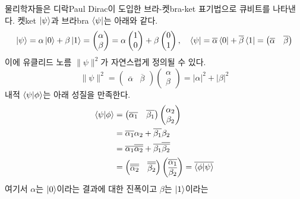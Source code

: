 \documentclass[a4paper,chapter,atbegshi]{oblivoir}
\begin{document}
물리학자들은 디락{\tiny Paul Dirac}이 도입한 브라-켓{\tiny bra-ket} 표기법으로
큐비트를 나타낸다. 켓{\tiny ket} $\ket{\psi}$과 브라{\tiny bra} $\bra{\psi}$는
아래와 같다.
 \[
   \ket{\psi} = \alpha\ket0+\beta\ket1 = \begin{pmatrix}\alpha\\\beta\end{pmatrix}
  =\alpha\begin{pmatrix}1\\0\end{pmatrix}+\beta\begin{pmatrix}0\\1\end{pmatrix},
  \quad
  \bra{\psi} = \overline{\alpha}\bra0 +\overline{\beta}\bra1=
   \begin{pmatrix}\overline{\alpha}&\overline{\beta}\end{pmatrix}
 \]
이에 유클리드 노름 $\|\psi\|^2$가 자연스럽게 정의될 수 있다. 
 \[
   \|\psi\|^2 = \begin{pmatrix}\overline{\alpha}&\overline{\beta}\end{pmatrix}
   \begin{pmatrix}\alpha\\\beta\end{pmatrix}=|\alpha|^2+|\beta|^2
 \]
 내적 $\braket{\psi|\phi}$는 아래 성질을 만족한다.
 \begin{align*}
   \braket{\psi|\phi} &= 
   \begin{pmatrix}\overline{\alpha_1} &\overline{\beta_1}\end{pmatrix}
   \begin{pmatrix}\alpha_2\\\beta_2\end{pmatrix} \\
    &= \overline{\alpha_1}\alpha_2+\overline{\beta_1}\beta_2\\
    &=\overline{\alpha_1}\overline{\overline{\alpha_2}}+
    \overline{\beta_1}\overline{\overline{\beta_2}} \\
    &= \begin{pmatrix}\overline{\overline{\alpha_2}} & \overline{\overline{\beta_2}}\end{pmatrix}
   \begin{pmatrix}\overline{\alpha_1}\\\overline{\beta_2}\end{pmatrix}
   = \overline{\braket{\phi|\psi}}
 \end{align*}
 여기서 $\alpha$는 $\ket{0}$이라는 결과에 대한 진폭이고 $\beta$는 $\ket{1}$이라는
\end{document}
